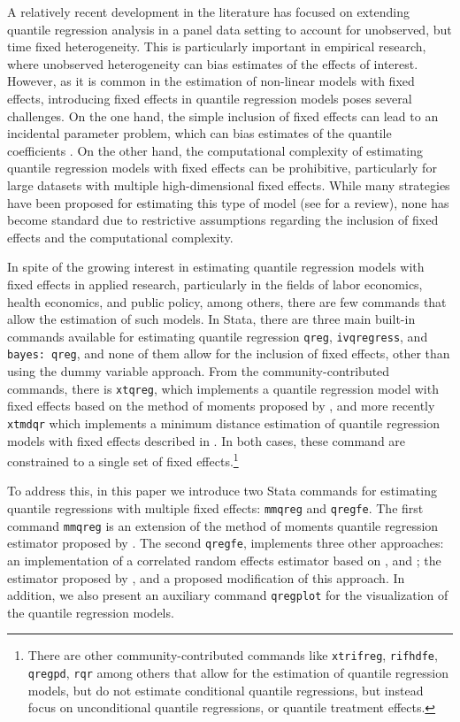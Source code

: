 \documentclass[bib]{statapress}
\begin{document}
A relatively recent development in the literature has focused on
extending quantile regression analysis in a panel data setting to
account for unobserved, but time fixed heterogeneity. This is
particularly important in empirical research, where unobserved
heterogeneity can bias estimates of the effects of interest. However, as
it is common in the estimation of non-linear models with fixed effects,
introducing fixed effects in quantile regression models poses several
challenges. On the one hand, the simple inclusion of fixed effects can
lead to an incidental parameter problem, which can bias estimates of the
quantile coefficients \citep{neymanscott1948, lancaster2000}. On the
other hand, the computational complexity of estimating quantile
regression models with fixed effects can be prohibitive, particularly
for large datasets with multiple high-dimensional fixed effects. While
many strategies have been proposed for estimating this type of model
(see \citet{galvao2017quantile} for a review), none has become standard
due to restrictive assumptions regarding the inclusion of fixed effects
and the computational complexity.

In spite of the growing interest in estimating quantile regression
models with fixed effects in applied research, particularly in the
fields of labor economics, health economics, and public policy, among
others, there are few commands that allow the estimation of such models.
In Stata, there are three main built-in commands available for
estimating quantile regression \texttt{qreg}, \texttt{ivqregress}, and
\texttt{bayes:\ qreg}, and none of them allow for the inclusion of fixed
effects, other than using the dummy variable approach. From the
community-contributed commands, there is \texttt{xtqreg}, which
implements a quantile regression model with fixed effects based on the
method of moments proposed by \citet{mss2019}, and more recently
\texttt{xtmdqr} which implements a minimum distance estimation of
quantile regression models with fixed effects described in
\citet{melly2023}. In both cases, these command are constrained to a
single set of fixed effects.\footnote{There are other
  community-contributed commands like \texttt{xtrifreg},
  \texttt{rifhdfe}, \texttt{qregpd}, \texttt{rqr} among others that
  allow for the estimation of quantile regression models, but do not
  estimate conditional quantile regressions, but instead focus on
  unconditional quantile regressions, or quantile treatment effects.}

To address this, in this paper we introduce two Stata commands for
estimating quantile regressions with multiple fixed effects:
\texttt{mmqreg} and \texttt{qregfe}. The first command \texttt{mmqreg}
is an extension of the method of moments quantile regression estimator
proposed by \citet{mss2019}. The second \texttt{qregfe}, implements
three other approaches: an implementation of a correlated random effects
estimator based on \citet{abrevaya2008}, \citet{wooldridge2019} and
\citet[Ch12.10.3]{wooldridge2010}; the estimator proposed by
\citet{canay2011}, and a proposed modification of this approach. In
addition, we also present an auxiliary command \texttt{qregplot} for the
visualization of the quantile regression models.
\end{document}
